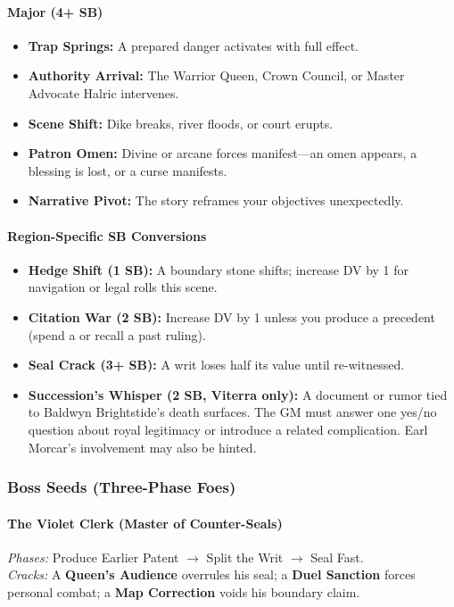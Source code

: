 \begin{itemize}[nosep]
\paragraph{Major (4+ SB)}
\begin{itemize}[nosep]
  \item \textbf{Trap Springs:} A prepared danger activates with full effect.
  \item \textbf{Authority Arrival:} The Warrior Queen, Crown Council, or Master Advocate Halric intervenes.
  \item \textbf{Scene Shift:} Dike breaks, river floods, or court erupts.
  \item \textbf{Patron Omen:} Divine or arcane forces manifest---an omen appears, a blessing is lost, or a curse manifests.
  \item \textbf{Narrative Pivot:} The story reframes your objectives unexpectedly.
\end{itemize}

\paragraph{Region-Specific SB Conversions}
\begin{itemize}[nosep]
  \item \textbf{Hedge Shift (1 SB):} A boundary stone shifts; increase DV by 1 for navigation or legal rolls this scene.
  \item \textbf{Citation War (2 SB):} Increase DV by 1 unless you produce a precedent (spend a \Diamond{} or recall a past ruling).
  \item \textbf{Seal Crack (3+ SB):} A writ loses half its value until re-witnessed.
  \item \textbf{Succession's Whisper (2 SB, Viterra only):} A document or rumor tied to Baldwyn Brightstide's death surfaces. The GM must answer one yes/no question about royal legitimacy or introduce a related complication. Earl Morcar's involvement may also be hinted.
\end{itemize}

\subsubsection{Boss Seeds (Three-Phase Foes)}

\paragraph{The Violet Clerk (Master of Counter-Seals)}
\emph{Phases:} Produce Earlier Patent $\rightarrow$ Split the Writ $\rightarrow$ Seal Fast.\\
\emph{Cracks:} A \textbf{Queen's Audience} overrules his seal; a \textbf{Duel Sanction} forces personal combat; a \textbf{Map Correction} voids his boundary claim.


\end{itemize}
